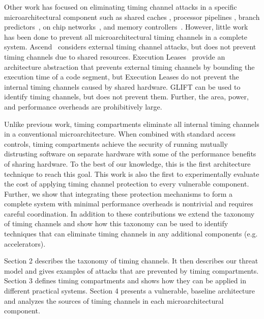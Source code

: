 Other work has focused on eliminating timing channel attacks in a specific 
microarchitectural component such as shared caches 
\cite{icache,newcache,deconstructing,cachegames}, processor pipelines 
\cite{pipelines}, branch predictors~\cite{branchpred,predictingbranch}, on chip 
networks~\cite{yaonocs}, and memory controllers~\cite{ushpca14}.
However, little work has been done to prevent all microarchitectural timing 
channels in a complete system. Ascend~\cite{ascend} considers external timing 
channel attacks, but does not prevent timing channels due to shared resources.  
Execution Leases~\cite{execution_leases} provide an architecture abstraction
that prevents external timing channels by bounding the execution time of a code 
segment, but Execution Leases do not prevent the internal timing channels 
caused by shared hardware. GLIFT \cite{citation_needed} can be used to identify 
timing channels, but does not prevent them. Further, the area, power, and 
performance overheads are prohibitively large.

Unlike previous work, timing compartments eliminate all internal timing 
channels in a conventional microarchitecture. When combined with standard 
access controls, timing compartments achieve the security of running mutually 
distrusting software on separate hardware with some of the performance benefits 
of sharing hardware. To the best of our knowledge, this is the first 
architecture technique to reach this goal. This work is also the first to 
experimentally evaluate the cost of applying timing channel protection to every 
vulnerable component. Further, we show that integrating these protection 
mechanisms to form a complete system with minimal performance overheads is 
nontrivial and requires careful coordination. In addition to these 
contributions we extend the taxonomy of timing channels and show how this 
taxonomy can be used to identify techniques that can eliminate timing channels 
in any additional components (e.g. accelerators).

Section 2 describes the taxonomy of timing channels. It then describes our 
threat model and gives examples of attacks that are prevented by timing 
compartments. Section 3 defines timing compartments and shows how they can be 
applied in different practical systems. Section 4 presents a vulnerable, 
baseline architecture and analyzes the sources of timing channels in each 
microarchitectural component.

